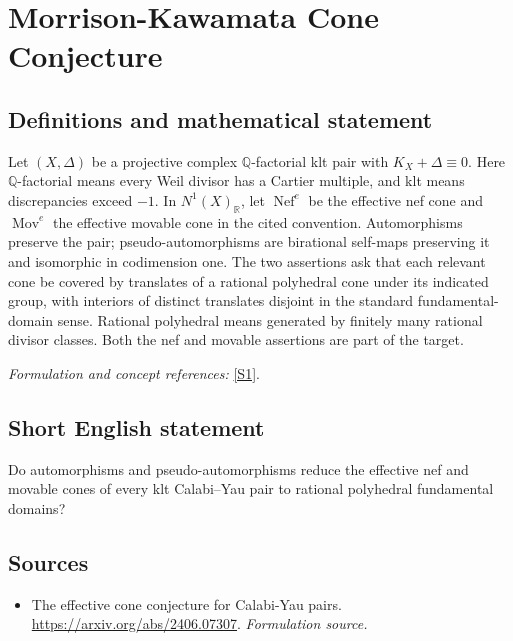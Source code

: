\documentclass[11pt]{article}
\begin{document}
\section*{\texorpdfstring{Morrison-Kawamata Cone Conjecture}{Morrison-Kawamata Cone Conjecture}}\label{240}
\subsection{Definitions and mathematical statement}
Let $(X,\Delta)$ be a projective complex ${\mathbb{Q}}$-factorial klt pair with $K_X+\Delta\equiv0$. Here ${\mathbb{Q}}$-factorial means every Weil divisor has a Cartier multiple, and klt means discrepancies exceed $-1$. In $N^1(X)_{{\mathbb{R}}}$, let $\operatorname{Nef}^e$ be the effective nef cone and $\operatorname{Mov}^e$ the effective movable cone in the cited convention. Automorphisms preserve the pair; pseudo-automorphisms are birational self-maps preserving it and isomorphic in codimension one. The two assertions ask that each relevant cone be covered by translates of a rational polyhedral cone under its indicated group, with interiors of distinct translates disjoint in the standard fundamental-domain sense. Rational polyhedral means generated by finitely many rational divisor classes. Both the nef and movable assertions are part of the target.
\par\smallskip\textit{Formulation and concept references:} \href{https://arxiv.org/abs/2406.07307}{[S1]}.

\subsection{Short English statement}
Do automorphisms and pseudo-automorphisms reduce the effective nef and movable cones of every klt Calabi–Yau pair to rational polyhedral fundamental domains?
\subsection{Sources}
\begin{itemize}
\item[S1]The effective cone conjecture for Calabi-Yau pairs.
\url{https://arxiv.org/abs/2406.07307}.
\textit{Formulation source.}
\end{itemize}
\end{document}
